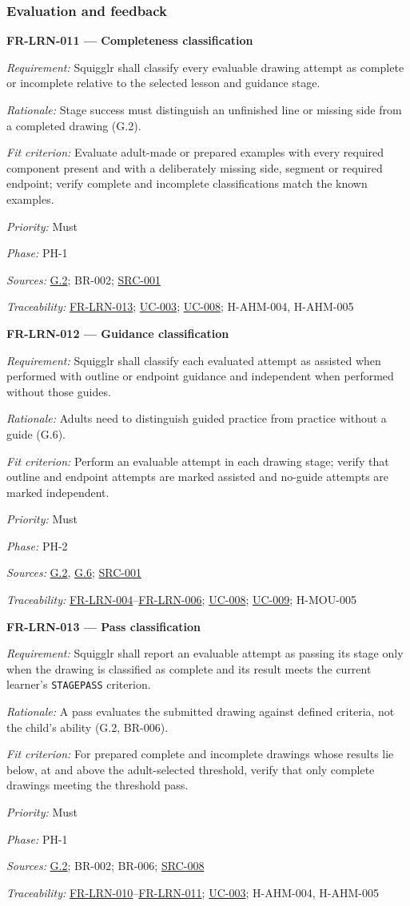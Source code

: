 \documentclass[12pt]{article}
\renewcommand{\_}{\textunderscore\allowbreak}%
\newcommand{\goalref}[1]{\hyperref[goal:#1]{G.#1}}
\newcommand{\ucref}[1]{\hyperref[uc:#1]{\mbox{UC-#1}}}
\newenvironment{srsrequirement}[2]{%
  \par\medskip\noindent\phantomsection\label{req:#1}%
  \textbf{#1 --- #2}\par\nobreak\smallskip }{\par\medskip}
\newcommand{\reqfield}[2]{\noindent\textit{#1:} #2\par}
\newcommand{\reqshall}[1]{\reqfield{Requirement}{#1}}
\newcommand{\reqrationale}[1]{\reqfield{Rationale}{#1}}
\newcommand{\reqfit}[1]{\reqfield{Fit criterion}{#1}}
\newcommand{\reqpriority}[1]{\reqfield{Priority}{#1}}
\newcommand{\reqphase}[1]{\reqfield{Phase}{#1}}
\newcommand{\reqsources}[1]{\reqfield{Sources}{#1}}
\newcommand{\reqtraces}[1]{\reqfield{Traceability}{#1}}
\newcommand{\reqref}[1]{\hyperref[req:#1]{#1}}
\newcommand{\srcref}[1]{\hyperref[src:#1]{SRC-#1}}
\providecommand{\ucref}[1]{\hyperref[uc:#1]{UC-#1}}
\begin{document}
\subsubsection{Evaluation and feedback}
\begin{srsrequirement}{FR-LRN-011}{Completeness classification}
  \reqshall{Squigglr shall classify every evaluable drawing attempt as complete
or incomplete relative to the selected lesson and guidance stage.}
\reqrationale{Stage success must distinguish an unfinished line or missing side
from a completed drawing (G.2).} \reqfit{Evaluate adult-made or prepared
examples with every required component present and with a deliberately missing
side, segment or required endpoint; verify complete and incomplete
classifications match the known examples.}
  \reqpriority{Must}
  \reqphase{PH-1}
  \reqsources{\goalref{2}; BR-002; \srcref{001}} \reqtraces{\reqref{FR-LRN-013};
  \ucref{003}; \ucref{008}; H-AHM-004, H-AHM-005}
\end{srsrequirement}

\begin{srsrequirement}{FR-LRN-012}{Guidance classification}
  \reqshall{Squigglr shall classify each evaluated attempt as assisted when
performed with outline or endpoint guidance and independent when performed
without those guides.} \reqrationale{Adults need to distinguish guided practice
from practice without a guide (G.6).} \reqfit{Perform an evaluable attempt in
each drawing stage; verify that outline and endpoint attempts are marked
assisted and no-guide attempts are marked independent.}
  \reqpriority{Must}
  \reqphase{PH-2}
  \reqsources{\goalref{2}, \goalref{6}; \srcref{001}}
  \reqtraces{\reqref{FR-LRN-004}--\reqref{FR-LRN-006}; \ucref{008}; \ucref{009};
  H-MOU-005}
\end{srsrequirement}

\begin{srsrequirement}{FR-LRN-013}{Pass classification}
  \reqshall{Squigglr shall report an evaluable attempt as passing its stage only
when the drawing is classified as complete and its result meets the current
learner's \texttt{STAGE\_\allowbreak PASS} criterion.} \reqrationale{A pass
evaluates the submitted drawing against defined criteria, not the child's
ability (G.2, BR-006).} \reqfit{For prepared complete and incomplete drawings
whose results lie below, at and above the adult-selected threshold, verify that
only complete drawings meeting the threshold pass.}
  \reqpriority{Must}
  \reqphase{PH-1}
  \reqsources{\goalref{2}; BR-002; BR-006; \srcref{008}}
  \reqtraces{\reqref{FR-LRN-010}--\reqref{FR-LRN-011}; \ucref{003}; H-AHM-004,
  H-AHM-005}
\end{srsrequirement}
\end{document}
